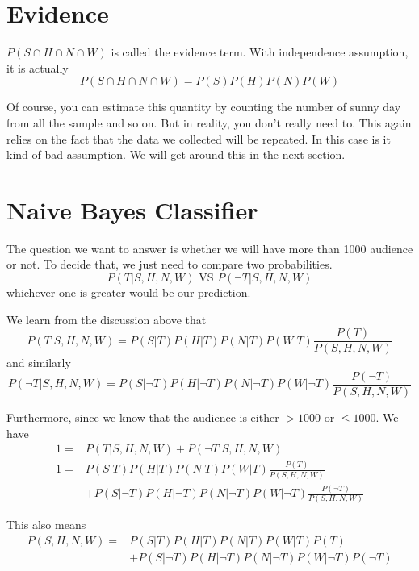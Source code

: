 \documentclass[a4paper, 12pt]{article}
\begin{document}
\section*{Evidence}

$P(S \cap H \cap N\cap W)$ is called the evidence term. With independence assumption, it is actually
\[
P(S \cap H \cap N\cap W) = P(S)P(H)P(N)P(W)
\]

Of course, you can estimate this quantity by counting the number of sunny day from all the sample and so on.  But in reality, you don't really need to. This again relies on the fact that the data we collected will be repeated. In this case is it kind of bad assumption. We will get around this in the next section.

\section*{Naive Bayes Classifier}

The question we want to answer is whether we will have more than \num{1000} audience or not. To decide that, we just need to compare two probabilities.
\[
	P(T | S,H,N,W) \text{ VS } P(\lnot T | S,H,N,W)
\]
whichever one is greater would be our prediction.

We learn from the discussion above that
\begin{equation}
P(T | S,H,N,W) = P(S|T) P(H|T) P(N|T) P(W|T) \frac{P(T)}{P(S,H,N,W)}
\end{equation}
and similarly
\begin{equation}
P(\lnot T | S,H,N,W) = P(S|\lnot T) P(H|\lnot T) P(N|\lnot T) P(W|\lnot T) \frac{P(\lnot T)}{P(S,H,N,W)}
\end{equation}

Furthermore, since we know that the audience is either $>\num{1000}$ or $\le \num{1000}$. We have
\begin{align}
1 = &  P(T | S,H,N,W) + P(\lnot T | S,H,N,W)\\
1 = & P(S|T) P(H|T) P(N|T) P(W|T) \frac{P(T)}{P(S,H,N,W)} \\
& + P(S|\lnot T) P(H|\lnot T) P(N|\lnot T) P(W|\lnot T) \frac{P(\lnot T)}{P(S,H,N,W)} 
\end{align}

This also means
\begin{align}
P(S,H,N,W) = & P(S|T) P(H|T) P(N|T) P(W|T) P(T) \\
& + P(S|\lnot T) P(H|\lnot T) P(N|\lnot T) P(W|\lnot T) P(\lnot T)
\end{align}
\end{document}
